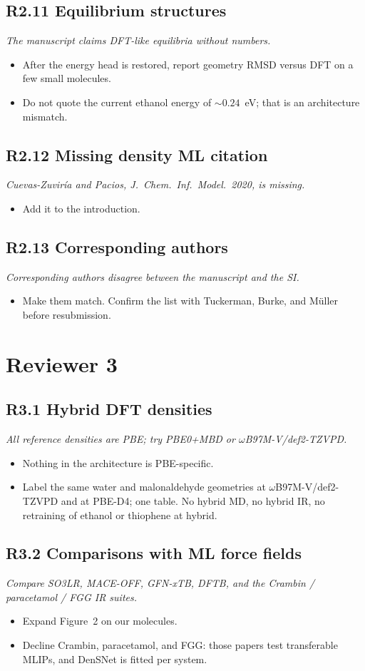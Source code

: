 \documentclass[11pt]{article}
\newcommand{\revpoint}[1]{\textit{#1}\par\nopagebreak\vspace{0.35em}}
\newcommand{\revhead}[1]{\subsection*{#1}}
\begin{document}
\revhead{R2.11 Equilibrium structures}
\revpoint{The manuscript claims DFT-like equilibria without numbers.}
\begin{itemize}
  \item After the energy head is restored, report geometry RMSD versus DFT on a few
        small molecules.
  \item Do not quote the current ethanol energy of ${\sim}0.24$~eV; that is an
        architecture mismatch.
\end{itemize}

\revhead{R2.12 Missing density ML citation}
\revpoint{Cuevas-Zuvir\'ia and Pacios, \textit{J.\ Chem.\ Inf.\ Model.}\ 2020, is missing.}
\begin{itemize}
  \item Add it to the introduction.
\end{itemize}

\revhead{R2.13 Corresponding authors}
\revpoint{Corresponding authors disagree between the manuscript and the SI.}
\begin{itemize}
  \item Make them match. Confirm the list with Tuckerman, Burke, and M\"uller before
        resubmission.
\end{itemize}

\section{Reviewer 3}

\revhead{R3.1 Hybrid DFT densities}
\revpoint{All reference densities are PBE; try PBE0+MBD or $\omega$B97M-V/def2-TZVPD.}
\begin{itemize}
  \item Nothing in the architecture is PBE-specific.
  \item Label the same water and malonaldehyde geometries at $\omega$B97M-V/def2-TZVPD
        and at PBE-D4; one table. No hybrid MD, no hybrid IR, no retraining of ethanol
        or thiophene at hybrid.
\end{itemize}

\revhead{R3.2 Comparisons with ML force fields}
\revpoint{Compare SO3LR, MACE-OFF, GFN-xTB, DFTB, and the Crambin / paracetamol / FGG IR suites.}
\begin{itemize}
  \item Expand Figure~2 on our molecules.
  \item Decline Crambin, paracetamol, and FGG: those papers test transferable MLIPs,
        and DenSNet is fitted per system.
\end{itemize}
\end{document}
